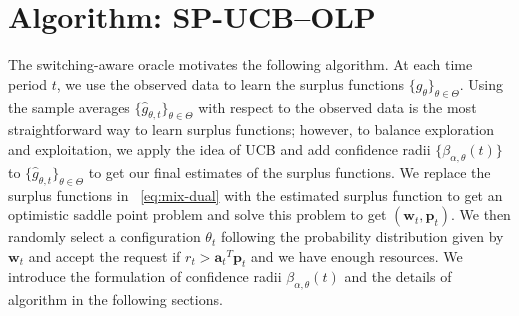 \documentclass[11pt]{article}
\newcommand{\ba}{\mathbf{a}}
\newcommand{\bp}{\mathbf{p}}
\newcommand{\bw}{\mathbf{w}}
\begin{document}
\section{Algorithm: SP-UCB--OLP}
\label{sec:algorithm}
The switching-aware oracle motivates the following algorithm. At each time period $t$, we use the observed data to learn the surplus functions $\{g_{\theta}\}_{\theta\in\Theta}$. Using the sample averages $\{\hat g_{\theta,t}\}_{\theta\in\Theta}$ with respect to the observed data is the most straightforward way to learn surplus functions; however, to balance exploration and exploitation, we apply the idea of UCB and add confidence radii $\{\beta_{\alpha,\theta}(t)\}$ to $\{\hat g_{\theta,t}\}_{\theta\in\Theta}$ to get our final estimates of the surplus functions. We replace the surplus functions in ~\eqref{eq:mix-dual} with the estimated surplus function to get an optimistic saddle point problem and solve this problem to get $(\bw_t,\bp_t)$. We then randomly select a configuration $\theta_t$ following the probability distribution given by $\bw_t$ and accept the request if $r_t>{\ba_t}^T\bp_t$ and we have enough resources. We introduce the formulation of confidence radii $\beta_{\alpha,\theta}(t)$ and the details of algorithm in the following sections.
\end{document}
